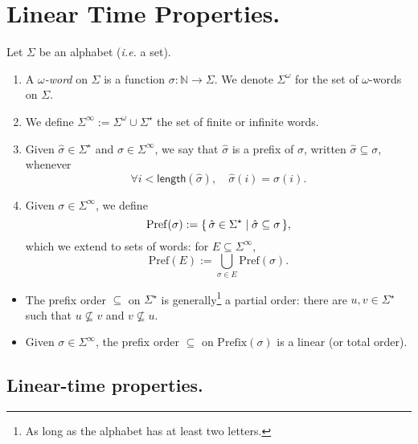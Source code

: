\documentclass[./main]{subfiles}
\begin{document}
  \chapter{Linear Time Properties.}

  \begin{defn}
    Let $\Sigma$ be an alphabet (\textit{i.e.} a set).
    \begin{enumerate}
      \item A \textit{$\omega$-word} on $\Sigma$ is a function $\sigma : \mathds{N} \to \Sigma$.
        We denote $\Sigma^\omega$ for the set of $\omega$-words on $\Sigma$.
      \item We define $\Sigma^\infty := \Sigma^\omega \cup \Sigma^\star$ the set of finite or infinite words.
      \item Given $\hat{\sigma} \in \Sigma^\star$ and $\sigma \in \Sigma^\infty$, we say that $\hat{\sigma}$ is a prefix of $\sigma$, written $\hat{\sigma} \subseteq \sigma$, whenever 
        \[
        \forall i < \mathsf{length}(\hat{\sigma}), \quad \hat{\sigma}(i) = \sigma(i)
        .\]
      \item Given $\sigma \in \Sigma^\infty$, we define \[
        \mathrm{Pref}(\sigma) := \mleft\{\,\hat{\sigma} \in \Sigma^\star \;\middle|\; \hat{\sigma} \subseteq \sigma\,\mright\} 
        ,\]
        which we extend to sets of words: for $E \subseteq \Sigma^\infty$,
        \[
          \mathrm{Pref}(E) := \bigcup_{\sigma \in E} \mathrm{Pref}(\sigma)
        .\]
    \end{enumerate}
  \end{defn}

  \begin{rmk}
    \begin{itemize}
      \item The prefix order $\subseteq$ on $\Sigma^\star$ is generally\footnote{As long as the alphabet has at least two letters.} a partial order: there are $u,v \in \Sigma^\star$ such that $u \not\subseteq v$ and $v \not\subseteq u$.
      \item Given $\sigma \in \Sigma^\infty$, the prefix order $\subseteq$ on $\mathrm{Prefix}(\sigma)$ is a linear (or total order).
    \end{itemize}
  \end{rmk}

  \section{Linear-time properties.}
\end{document}
